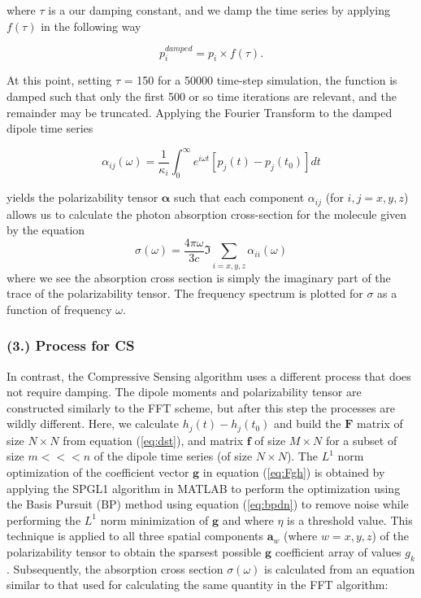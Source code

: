 \documentclass[11pt]{article}
\begin{document}
where $\tau$ is a our damping constant, and we damp the time series by applying $f(\tau)$ in the following way

\begin{equation}\label{eq:serdamp}
	p_{i}^{damped} = p_{i} \times f(\tau).
\end{equation}

At this point, setting $\tau$ = 150 for a 50000 time-step simulation, the function is damped such that only the first 500 or so time iterations are relevant, and the remainder may be truncated.  Applying the Fourier Transform to the damped dipole time series 

\begin{equation}\label{eq:pol}
	\alpha_{ij}(\omega) = \frac{1}{\kappa_{i}}\int_{0}^{\infty}  e^{i\omega t} [p_{j}(t) - p_{j}(t_{0})] dt
\end{equation}

yields the polarizability tensor $\mathbf{\alpha}$ such that each component $\alpha_{ij}$ (for $i,j = x,y,z$) allows us to calculate the photon absorption cross-section for the molecule given by the equation
\begin{equation}\label{eq:fftcross}
	\sigma(\omega) = \frac{4 \pi \omega}{3c}  \Im\sum_{i = x, y, z} \alpha_{ii}(\omega)
\end{equation}
where we see the absorption cross section is simply the imaginary part of the trace of the polarizability tensor.  The frequency spectrum is plotted for $\sigma$ as a function of frequency $\omega$.

\subsubsection*{(3.)	Process for CS}	

\par In contrast, the Compressive Sensing algorithm uses a different process that does not require damping.  The dipole moments and polarizability tensor are constructed similarly to the FFT scheme, but after this step the processes are wildly different. Here, we calculate $h_{j}(t) - h_{j}(t_{0})$ and build the $\mathbf{F}$ matrix of size $N \times N$ from equation (\ref{eq:dst}), and matrix $\mathbf{f}$ of size $M \times N$  for a subset of size $m <<< n$ of the dipole time series (of size $N \times N$).  The $L^{1}$ norm optimization of the coefficient vector $\mathbf{g}$ in equation (\ref{eq:Fgh}) is obtained by applying the SPGL1 algorithm in MATLAB to perform the optimization using the Basis Pursuit (BP) method using equation (\ref{eq:bpdn}) to remove noise while performing the $L^{1}$ norm minimization of $\mathbf{g}$ and where $\eta$ is a threshold value. This technique is applied to all three spatial components $\mathbf{a}_{w}$ (where $w = x,y,z$) of the polarizability tensor to obtain the sparsest possible $\mathbf{g}$ coefficient array of values $g_{k}$.  Subsequently, the absorption cross section $\sigma(\omega)$ is calculated from an equation similar to that used for calculating the same quantity in the FFT algorithm:
\end{document}
